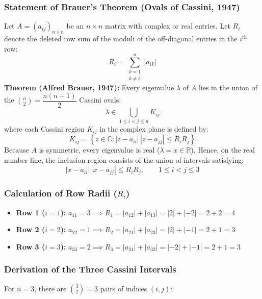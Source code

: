 \documentclass[11pt,a4paper]{article}
\newcommand{\R}{\mathbb{R}}
\newcommand{\C}{\mathbb{C}}
\newcommand{\abs}[1]{\left\lvert#1\right\rvert}
\begin{document}
\subsubsection*{Statement of Brauer's Theorem (Ovals of Cassini, 1947)}
Let $A = (a_{ij})_{n \times n}$ be an $n \times n$ matrix with complex or real entries. Let $R_i$ denote the deleted row sum of the moduli of the off-diagonal entries in the $i^{\text{th}}$ row:
\begin{equation}
R_i = \sum_{\substack{k=1 \\ k \neq i}}^n \abs{a_{ik}}
\end{equation}
\textbf{Theorem (Alfred Brauer, 1947):} Every eigenvalue $\lambda$ of $A$ lies in the union of the $\binom{n}{2} = \dfrac{n(n-1)}{2}$ Cassini ovals:
\begin{equation}
\lambda \in \bigcup_{1 \le i < j \le n} K_{ij}
\end{equation}
where each Cassini region $K_{ij}$ in the complex plane is defined by:
\begin{equation}
K_{ij} = \left\{ z \in \C : \abs{z - a_{ii}} \, \abs{z - a_{jj}} \le R_i R_j \right\}
\end{equation}
Because $A$ is symmetric, every eigenvalue is real ($\lambda = x \in \R$). Hence, on the real number line, the inclusion region consists of the union of intervals satisfying:
\begin{equation}
\abs{x - a_{ii}} \, \abs{x - a_{jj}} \le R_i R_j, \qquad 1 \le i < j \le 3
\end{equation}

\subsubsection*{Calculation of Row Radii ($R_i$)}
\begin{itemize}[leftmargin=*]
    \item \textbf{Row 1 ($i = 1$):} $a_{11} = 3 \implies R_1 = \abs{a_{12}} + \abs{a_{13}} = \abs{2} + \abs{-2} = 2 + 2 = 4$
    \item \textbf{Row 2 ($i = 2$):} $a_{22} = 1 \implies R_2 = \abs{a_{21}} + \abs{a_{23}} = \abs{2} + \abs{-1} = 2 + 1 = 3$
    \item \textbf{Row 3 ($i = 3$):} $a_{33} = 2 \implies R_3 = \abs{a_{31}} + \abs{a_{32}} = \abs{-2} + \abs{-1} = 2 + 1 = 3$
\end{itemize}

\subsubsection*{Derivation of the Three Cassini Intervals}
For $n = 3$, there are $\binom{3}{2} = 3$ pairs of indices $(i, j)$:
\end{document}
